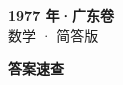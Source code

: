 \documentclass[zihao=-4, a4paper]{ctexart}
\begin{document}
\begin{center}
  {\Large\bfseries 1977 年·广东卷}\\[4pt]
  {\large 数学 · 简答版}
\end{center}
\medskip
{}

\clearpage
{}
\begin{center}{\Large\bfseries 答案速查}\end{center}
\medskip

\end{document}
